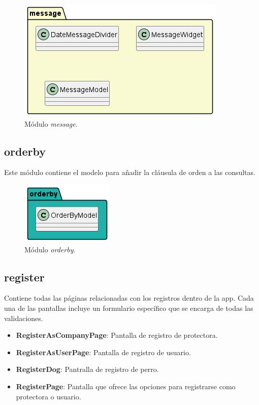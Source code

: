 \documentclass[a4paper, 12pt]{article}
\begin{document}
\begin{figure}[H]
	\begin{center}
		{\includegraphics[width=0.8\linewidth]{diagram/Message.png}\par}
		\caption{Módulo  \textit{message}.}
	\end{center}
\end{figure}


\subsection*{orderby}

Este módulo contiene el modelo para añadir la cláusula de orden a las consultas.

\begin{figure}[H]
	\begin{center}
		{\includegraphics[]{diagram/OrderBy.png}\par}
		\caption{Módulo  \textit{orderby}.}
	\end{center}
\end{figure}


\subsection*{register}

Contiene todas las páginas relacionadas con los registros dentro de la app. Cada una de las pantallas incluye un formulario específico que se encarga de todas las validaciones.

\begin{itemize}[noitemsep]
	\item \textbf{RegisterAsCompanyPage}: Pantalla de registro de protectora.
	\item \textbf{RegisterAsUserPage}: Pantalla de registro de usuario.
	\item \textbf{RegisterDog}: Pantralla de registro de perro.
	\item \textbf{RegisterPage}:  Pantalla que ofrece las opciones para registrarse como protectora o usuario.
\end{itemize}
\end{document}
